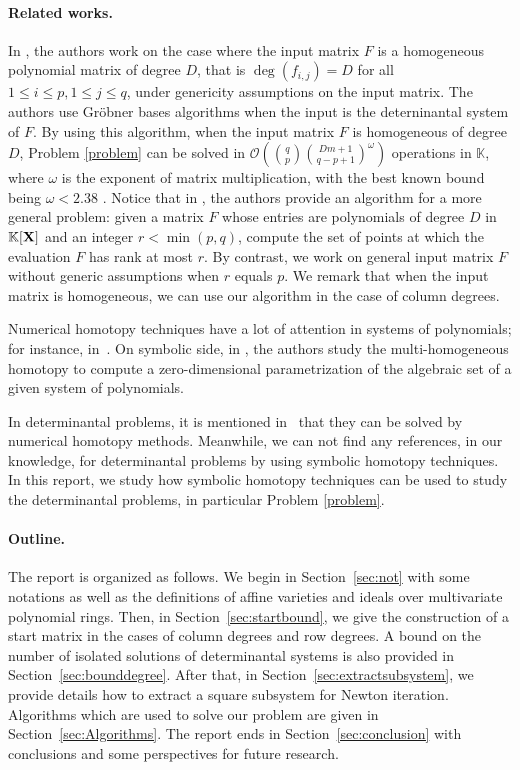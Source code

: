 \documentclass[11pt]{article}
\numberwithin{Property}{section}
\numberwithin{Theorem}{section}
\numberwithin{Proposition}{section}
\numberwithin{Lemma}{section}
\numberwithin{Corollary}{section}
\numberwithin{Definition}{section}
\numberwithin{Remark}{section}
\numberwithin{Conjecture}{section}
\numberwithin{Problem}{section}
\numberwithin{Claim}{section}
\theoremstyle{definition}
\numberwithin{Example}{section}
\renewcommand{\leq}{\leqslant}
\newcommand{\bigO}[1]{\mathcal{O}(#1)} %
\newcommand{\expmatmul}{\omega} %
\newcommand{\field}{\mathbb{K}} %
\newcommand{\mat}[1]{\mathbf{\MakeUppercase{#1}}} %
\begin{document}
\paragraph{Related works.} In \cite{FauSafSpa13}, the authors work on the case where the input matrix $F$ is a homogeneous polynomial matrix of degree $D$, that is $\deg(f_{i,j}) = D$ for all $1 \leq i \leq p, 1 \leq j \leq q$, under genericity assumptions on the input matrix. The authors use Gröbner bases algorithms when the input is the deterninantal system of $F$. By using this algorithm, when the input matrix $F$ is homogeneous of degree $D$, Problem \ref{problem} can be solved in $\bigO{{q \choose p}{{Dm+1} \choose {q-p+1}}^{\expmatmul}}$ operations in $\field$, where $\expmatmul$ is the exponent of matrix multiplication, with the best known bound being $\expmatmul < 2.38$ \cite{CopWin90, LeGall14}. Notice that in \cite{FauSafSpa13}, the authors provide an algorithm for a more general problem: given a matrix $F$ whose entries are polynomials of degree $D$ in $\field[\mat{X}]$ and an integer $r < \min(p,q)$, compute the set of points at which the evaluation $F$ has rank at most $r$. By contrast, we work on general input matrix $F$ without generic assumptions when $r$ equals $p$. We remark that when the input matrix is homogeneous, we can use our algorithm in the case of column degrees. 

Numerical homotopy techniques have a lot of attention in systems of polynomials; for instance, in~\cite{MORGAN872, MORGAN87, Morgan89,SAWC05,Zul88}. On symbolic side, in \cite{SaSc16}, the authors study the multi-homogeneous homotopy to compute a zero-dimensional parametrization of the algebraic set of a given system of polynomials. 

In determinantal problems, it is mentioned in~\cite{Ver89} that they can be solved by numerical homotopy methods. Meanwhile, we can not find any references, in our knowledge, for determinantal problems by using symbolic homotopy techniques. In this report, we study how symbolic homotopy techniques can be used to study the determinantal problems, in particular Problem \ref{problem}. 

\paragraph{Outline.} The report is organized as follows. We begin in Section~\ref{sec:not} with some notations as well as the definitions of affine varieties and ideals over multivariate polynomial rings. Then, in Section~\ref{sec:startbound}, we give the construction of a start matrix in the cases of column degrees and row degrees. A bound on the number of isolated solutions of determinantal systems is also provided in Section~\ref{sec:bounddegree}. After that, in Section~\ref{sec:extractsubsystem}, we provide details how to extract a square subsystem for Newton iteration. Algorithms which are used to solve our problem are given in  Section~\ref{sec:Algorithms}. The report ends in Section~\ref{sec:conclusion} with conclusions and some perspectives for future research. 
\end{document}
